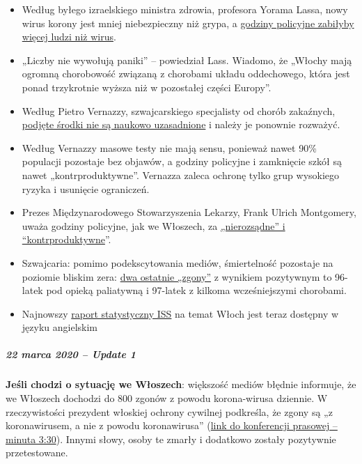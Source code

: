 \begin{itemize}
\tightlist
\item
  Według byłego izraelskiego ministra zdrowia, profesora Yorama Lassa,
  nowy wirus korony jest mniej niebezpieczny niż grypa, a
  \href{https://en.globes.co.il/en/article-lockdown-lunacy-1001322696}{godziny
  policyjne zabiłyby więcej ludzi niż wirus}.
\item
  „Liczby nie wywołują paniki'' -- powiedział Lass. Wiadomo, że „Włochy
  mają ogromną chorobowość związaną z chorobami układu oddechowego,
  która jest ponad trzykrotnie wyższa niż w pozostałej części Europy''.
\item
  Według Pietro Vernazzy, szwajcarskiego specjalisty od chorób
  zakaźnych,
  \href{https://www.tagblatt.ch/leben/ostschweizer-infektiologe-pietro-vernazza-die-zahlen-zu-den-jungen-corona-virus-erkrankten-sind-irrefuehrend-ld.1206440}{podjęte
  środki nie są naukowo uzasadnione} i należy je ponownie rozważyć.
\item
  Według Vernazzy masowe testy nie mają sensu, ponieważ nawet 90\%
  populacji pozostaje bez objawów, a godziny policyjne i zamknięcie
  szkół są nawet „kontrproduktywne''. Vernazza zaleca ochronę tylko grup
  wysokiego ryzyka i usunięcie ograniczeń.
\item
  Prezes Międzynarodowego Stowarzyszenia Lekarzy, Frank Ulrich
  Montgomery, uważa godziny policyjne, jak we Włoszech, za
  \href{https://www.general-anzeiger-bonn.de/news/politik/deutschland/interview-mit-weltaerztepraesident-montgomery-ueber-corona-pandemie-ist-chaos_aid-49609561}{„nierozsądne''
  i ``kontrproduktywne}''.
\item
  Szwajcaria: pomimo podekscytowania mediów, śmiertelność pozostaje na
  poziomie bliskim zera:
  \href{https://www.bluewin.ch/de/newsregional/zuerich/1068-bestatigte-corona-falle-und-funf-todesfalle-im-kanton-zurich-371873.html}{dwa
  ostatnie „zgony''} z wynikiem pozytywnym to 96-latek pod opieką
  paliatywną i 97-latek z kilkoma wcześniejszymi chorobami.
\item
  Najnowszy
  \href{https://www.epicentro.iss.it/coronavirus/bollettino/Report-COVID-2019_20_marzo_eng.pdf}{raport
  statystyczny ISS} na temat Włoch jest teraz dostępny w języku
  angielskim
\end{itemize}

\hypertarget{22-marca-2020--update-1}{%
\subparagraph{\texorpdfstring{\textbf{22 marca 2020 -- Update
1}}{22 marca 2020 -- Update 1}}\label{22-marca-2020--update-1}}

\textbf{Jeśli chodzi o sytuację we Włoszech}: większość mediów błędnie
informuje, że we Włoszech dochodzi do 800 zgonów z powodu korona-wirusa
dziennie. W rzeczywistości prezydent włoskiej ochrony cywilnej
podkreśla, że zgony są „z koronawirusem, a nie z powodu koronawirusa''
(\href{https://youtu.be/0M4kbPDHGR0?t=210}{link do konferencji prasowej
-- minuta 3:30}). Innymi słowy, osoby te zmarły i dodatkowo zostały
pozytywnie przetestowane.

